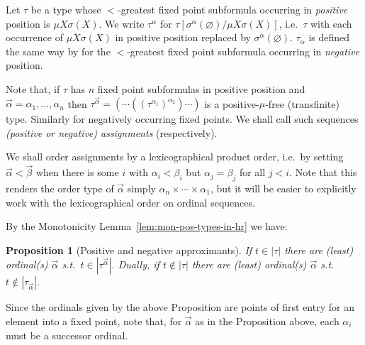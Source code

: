 \documentclass[10pt,a4paper]{amsart}
\theoremstyle{plain}
\newtheorem{proposition}[proposition]{Proposition}
\theoremstyle{definition}
\newtheorem{definition}[definition]{Definition}
\newtheorem{remark}[remark]{Remark}
\renewcommand{\emptyset}{\varnothing}
\newcommand{\oldtodo}[1]{\todo{#1}} %
\newcommand{\anupam}[1]{\todo[color=green]{A: #1}}
\renewcommand{\todo}[1]{}
\renewcommand{\anupam}[1]{}
\theoremstyle{plain}
\theoremstyle{definition} %
\newcommand{\hr}[1]{|#1|}
\begin{document}
Let $\tau$ be a type whose $<$-greatest fixed point subformula occurring in \emph{positive} position is $\mu X \sigma(X)$.
We write $\tau^\alpha$ for $\tau[\sigma^\alpha(\emptyset) / \mu X\sigma(X)]$, i.e.\ $\tau$ with each occurrence of $\mu X\sigma(X)$ in positive position replaced by $\sigma^\alpha(\emptyset)$.
$\tau_\alpha$ is defined the same way by for the $<$-greatest fixed point subformula occurring in \emph{negative} position.

Note that, if $\tau$ has $n$ fixed point subformulas in positive position and $\vec \alpha = \alpha_1 ,\dots, \alpha_n$ then $\tau^{\vec \alpha} = (\cdots ((\tau^{\alpha_1})^{\alpha_2})\cdots)$ is a positive-$\mu$-free (transfinite) type.
Similarly for negatively occurring fixed points.
We shall call such sequences \emph{(positive or negative) assignments} (respectively).

We shall order assignments by a lexicographical product order, i.e.\ by setting $\vec \alpha < \vec \beta$ when there is some $i$ with $\alpha_i < \beta_i$ but $\alpha_j = \beta_j$ for all $j<i$. 
Note that this renders the order type of $\vec \alpha$ simply $\alpha_n \times \cdots \times \alpha_1$, but it will be easier to explicitly work with the lexicographical order on ordinal sequences.


By the Monotonicity Lemma~\ref{lem:mon-pos-types-in-hr} we have:
\begin{proposition}
[Positive and negative approximants]
\label{prop:pos-neg-approximants}
If $t \in \hr\tau$ there are (least) ordinal(s) $\vec \alpha$ s.t.\ $t \in \hr{\tau^{\vec \alpha}}$.
% 
Dually, if $t \notin \hr \tau$ there are (least) ordinal(s) $\vec \alpha$ s.t.\ $t \notin \hr{\tau_{\vec \alpha}}$.
\end{proposition}

\anupam{commented `approximants are successors' below, now obsolete}
Since the ordinals given by the above Proposition are points of first entry for an element into a fixed point,
note that, for $\vec \alpha$ as in the Proposition above, each $\alpha_i$ must be a successor ordinal.



\end{document}
